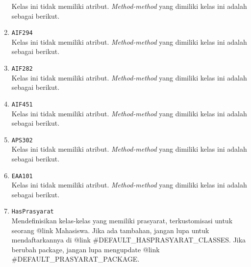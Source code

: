 \documentclass{article}
\begin{document}
\begin{enumerate}
Kelas ini tidak memiliki atribut. \textit{Method-method} yang dimiliki kelas ini adalah sebagai berikut.
\begin{itemize}
\end{itemize}
\item \texttt{AIF294}\\ 
Kelas ini tidak memiliki atribut. \textit{Method-method} yang dimiliki kelas ini adalah sebagai berikut.
\begin{itemize}
\end{itemize}
\item \texttt{AIF282}\\ 
Kelas ini tidak memiliki atribut. \textit{Method-method} yang dimiliki kelas ini adalah sebagai berikut.
\begin{itemize}
\end{itemize}
\item \texttt{AIF451}\\ 
Kelas ini tidak memiliki atribut. \textit{Method-method} yang dimiliki kelas ini adalah sebagai berikut.
\begin{itemize}
\end{itemize}
\item \texttt{APS302}\\ 
Kelas ini tidak memiliki atribut. \textit{Method-method} yang dimiliki kelas ini adalah sebagai berikut.
\begin{itemize}
\end{itemize}
\item \texttt{EAA101}\\ 
Kelas ini tidak memiliki atribut. \textit{Method-method} yang dimiliki kelas ini adalah sebagai berikut.
\begin{itemize}
\end{itemize}
\item \texttt{HasPrasyarat}\\ 
Mendefinisikan kelas-kelas yang memiliki prasyarat, terkustomisasi
 untuk seorang {@link Mahasiswa}. Jika ada tambahan, jangan lupa untuk
 mendaftarkannya di {@link #DEFAULT_HASPRASYARAT_CLASSES}. Jika berubah package,
 jangan lupa mengupdate {@link #DEFAULT_PRASYARAT_PACKAGE}.


\end{enumerate}
\end{document}
